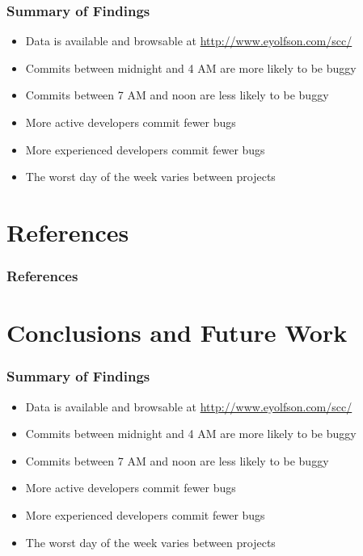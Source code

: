 \documentclass[aspectratio=43]{beamer}
\begin{document}
\begin{frame}
  \frametitle{Summary of Findings}
  
  \begin{itemize}
    \item Data is available and browsable at \url{http://www.eyolfson.com/scc/}

    \item Commits between midnight and 4 AM are more likely to be buggy

    \item Commits between 7 AM and noon are less likely to be buggy

    \item More active developers commit fewer bugs

    \item More experienced developers commit fewer bugs

    \item The worst day of the week varies between projects
  \end{itemize}
\end{frame}

\section*{References}
\begin{frame}
  \frametitle{References}
  
  
\end{frame}

\section*{Conclusions and Future Work}
\begin{frame}
  \frametitle{Summary of Findings}

  \begin{itemize}
    \item Data is available and browsable at \url{http://www.eyolfson.com/scc/}

    \item Commits between midnight and 4 AM are more likely to be buggy

    \item Commits between 7 AM and noon are less likely to be buggy

    \item More active developers commit fewer bugs

    \item More experienced developers commit fewer bugs

    \item The worst day of the week varies between projects
  \end{itemize}
\end{frame}
\end{document}
